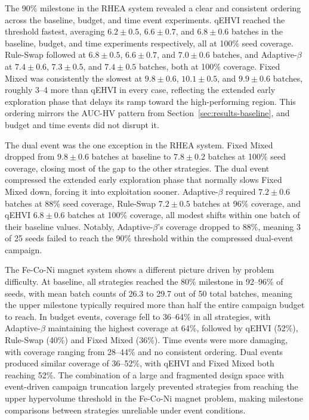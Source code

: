 The 90\% milestone in the RHEA system revealed a clear and consistent ordering across the baseline, budget, and time event experiments. qEHVI reached the threshold fastest, averaging $6.2 \pm 0.5$, $6.6 \pm 0.7$, and $6.8 \pm 0.6$ batches in the baseline, budget, and time experiments respectively, all at 100\% seed coverage. Rule-Swap followed at $6.8 \pm 0.5$, $6.6 \pm 0.7$, and $7.0 \pm 0.6$ batches, and Adaptive-$\beta$ at $7.4 \pm 0.6$, $7.3 \pm 0.5$, and $7.4 \pm 0.5$ batches, both at 100\% coverage. Fixed Mixed was consistently the slowest at $9.8 \pm 0.6$, $10.1 \pm 0.5$, and $9.9 \pm 0.6$ batches, roughly 3--4 more than qEHVI in every case, reflecting the extended early exploration phase that delays its ramp toward the high-performing region. This ordering mirrors the AUC-HV pattern from Section~\ref{sec:results-baseline}, and budget and time events did not disrupt it.

The dual event was the one exception in the RHEA system. Fixed Mixed dropped from $9.8 \pm 0.6$ batches at baseline to $7.8 \pm 0.2$ batches at 100\% seed coverage, closing most of the gap to the other strategies. The dual event compressed the extended early exploration phase that normally slows Fixed Mixed down, forcing it into exploitation sooner. Adaptive-$\beta$ required $7.2 \pm 0.6$ batches at 88\% seed coverage, Rule-Swap $7.2 \pm 0.5$ batches at 96\% coverage, and qEHVI $6.8 \pm 0.6$ batches at 100\% coverage, all modest shifts within one batch of their baseline values. Notably, Adaptive-$\beta$'s coverage dropped to 88\%, meaning 3 of 25 seeds failed to reach the 90\% threshold within the compressed dual-event campaign.

The Fe-Co-Ni magnet system shows a different picture driven by problem difficulty. At baseline, all strategies reached the 80\% milestone in 92--96\% of seeds, with mean batch counts of 26.3 to 29.7 out of 50 total batches, meaning the upper milestone typically required more than half the entire campaign budget to reach. In budget events, coverage fell to 36--64\% in all strategies, with Adaptive-$\beta$ maintaining the highest coverage at 64\%, followed by qEHVI (52\%), Rule-Swap (40\%) and Fixed Mixed (36\%). Time events were more damaging, with coverage ranging from 28--44\% and no consistent ordering. Dual events produced similar coverage of 36--52\%, with qEHVI and Fixed Mixed both reaching 52\%. The combination of a large and fragmented design space with event-driven campaign truncation largely prevented strategies from reaching the upper hypervolume threshold in the Fe-Co-Ni magnet problem, making milestone comparisons between strategies unreliable under event conditions.

